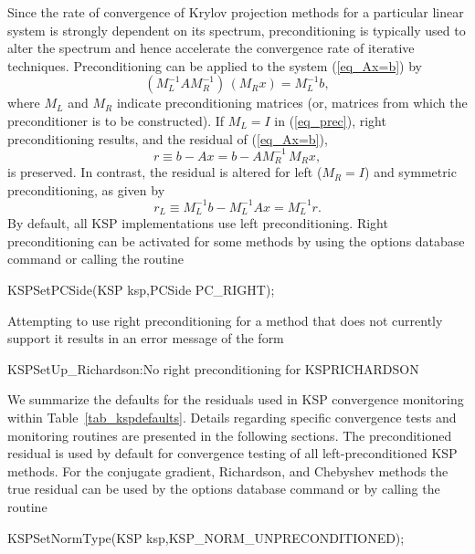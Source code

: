 Since the rate of convergence of Krylov projection methods for a
particular linear system is strongly dependent on its spectrum,
preconditioning is typically used to alter the spectrum and hence
accelerate the convergence rate of iterative techniques.
Preconditioning can be applied to the system (\ref{eq_Ax=b}) by
\begin{equation}
   (M_L^{-1} A M_R^{-1}) \, (M_R x) = M_L^{-1} b,
\label{eq_prec}
\end{equation}
where $ M_L$ and $ M_R $ indicate preconditioning matrices (or, matrices
from which the preconditioner is to be constructed).  If $ M_L = I $
in (\ref{eq_prec}), right preconditioning results, and the
residual of (\ref{eq_Ax=b}),
  \[ r \equiv b - Ax = b - A M_R^{-1} \, M_R x, \]
is preserved.  In contrast, the residual is altered for left 
($ M_R = I $) and symmetric preconditioning, as given by
  \[ r_L \equiv M_L^{-1} b - M_L^{-1} A x = M_L^{-1} r. \]
By default, all KSP implementations use left preconditioning.  
Right preconditioning can be activated for some methods by
using the options database command  or
calling the routine 
\begin{tabbing}
  KSPSetPCSide(KSP ksp,PCSide PC\_RIGHT);
\end{tabbing}
Attempting to use right preconditioning for a method that
does not currently support it results in an error message of the form
\begin{tabbing}
   KSPSetUp\_Richardson:No right preconditioning for KSPRICHARDSON
\end{tabbing}

We summarize the defaults for the residuals used in KSP convergence
monitoring within Table~\ref{tab_kspdefaults}.  Details regarding
specific convergence tests and monitoring routines are presented in
the following sections.  The preconditioned residual is used by
default for convergence testing of all left-preconditioned KSP
methods. For the conjugate gradient, Richardson, and
Chebyshev methods the true residual can be used by
the options database command  or by calling the routine
\begin{tabbing}
  KSPSetNormType(KSP ksp,KSP\_NORM\_UNPRECONDITIONED);
\end{tabbing}

